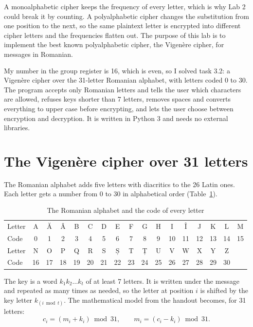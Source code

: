 \documentclass[11pt,a4paper]{article}
\begin{document}
\utmtitlepage
\tableofcontents
\newpage


A monoalphabetic cipher keeps the frequency of every letter, which is why Lab 2 could break it by
counting. A polyalphabetic cipher changes the substitution from one position to the next, so the
same plaintext letter is encrypted into different cipher letters and the frequencies flatten out.
The purpose of this lab is to implement the best known polyalphabetic cipher, the Vigenère cipher,
for messages in Romanian.

My number in the group register is 16, which is even, so I solved task 3.2: a Vigenère cipher over
the 31-letter Romanian alphabet, with letters coded 0 to 30. The program accepts only Romanian
letters and tells the user which characters are allowed, refuses keys shorter than 7 letters,
removes spaces and converts everything to upper case before encrypting, and lets the user choose
between encryption and decryption. It is written in Python 3 and needs no external libraries.

\section{The Vigenère cipher over 31 letters}

The Romanian alphabet adds five letters with diacritics to the 26 Latin ones. Each letter gets a
number from 0 to 30 in alphabetical order (Table~\ref{tab:alpha}).

\begin{table}[H]
\centering
\caption{The Romanian alphabet and the code of every letter}\label{tab:alpha}
\setlength{\tabcolsep}{3.6pt}
\small
\begin{tabular}{l*{16}{c}}
\toprule
Letter & A & Ă & Â & B & C & D & E & F & G & H & I & Î & J & K & L & M \\
Code & 0 & 1 & 2 & 3 & 4 & 5 & 6 & 7 & 8 & 9 & 10 & 11 & 12 & 13 & 14 & 15 \\
\midrule
Letter & N & O & P & Q & R & S & Ș & T & Ț & U & V & W & X & Y & Z & \\
Code & 16 & 17 & 18 & 19 & 20 & 21 & 22 & 23 & 24 & 25 & 26 & 27 & 28 & 29 & 30 & \\
\bottomrule
\end{tabular}
\end{table}

The key is a word $k_1 k_2 \dots k_t$ of at least 7 letters. It is written under the message and
repeated as many times as needed, so the letter at position $i$ is shifted by the key letter
$k_{(i \bmod t)}$. The mathematical model from the handout becomes, for 31 letters:
\[
  c_i = (m_i + k_i) \bmod 31, \qquad m_i = (c_i - k_i) \bmod 31 .
\]
\end{document}

